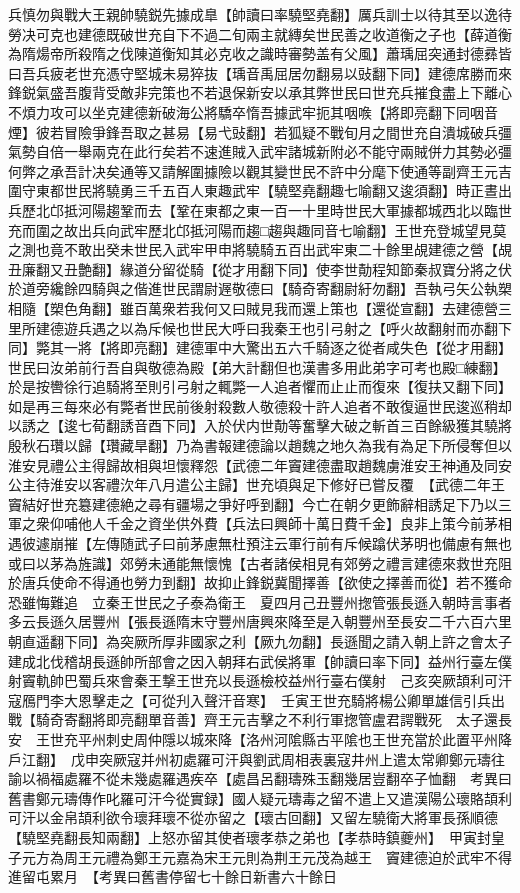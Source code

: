兵慎勿與戰大王親帥驍鋭先據成臯【帥讀曰率驍堅堯翻】厲兵訓士以待其至以逸待勞决可克也建德既破世充自下不過二旬兩主就縳矣世民善之收道衡之子也【薛道衡為隋煬帝所殺隋之伐陳道衡知其必克收之識時審勢盖有父風】蕭瑀屈突通封德彞皆曰吾兵疲老世充憑守堅城未易猝抜【瑀音禹屈居勿翻易以䜴翻下同】建德席勝而來鋒鋭氣盛吾腹背受敵非完策也不若退保新安以承其弊世民曰世充兵摧食盡上下離心不煩力攻可以坐克建德新破海公將驕卒惰吾據武牢扼其咽㗋【將即亮翻下同咽音煙】彼若冒險爭鋒吾取之甚易【易弋䜴翻】若狐疑不戰旬月之間世充自潰城破兵彊氣勢自倍一舉兩克在此行矣若不速進賊入武牢諸城新附必不能守兩賊併力其勢必彊何弊之承吾計决矣通等又請解圍據險以觀其變世民不許中分麾下使通等副齊王元吉圍守東都世民將驍勇三千五百人東趣武牢【驍堅堯翻趣七喻翻又逡須翻】時正晝出兵歷北邙抵河陽趨鞏而去【鞏在東都之東一百一十里時世民大軍據都城西北以臨世充而圍之故出兵向武牢歷北邙抵河陽而趨□趨與趣同音七喻翻】王世充登城望見莫之測也竟不敢出癸未世民入武牢甲申將驍騎五百出武牢東二十餘里覘建德之營【覘丑廉翻又丑艶翻】緣道分留從騎【從才用翻下同】使李世勣程知節秦叔寶分將之伏於道旁纔餘四騎與之偕進世民謂尉遟敬德曰【騎奇寄翻尉紆勿翻】吾執弓矢公執槊相隨【槊色角翻】雖百萬衆若我何又曰賊見我而還上策也【還從宣翻】去建德營三里所建德遊兵遇之以為斥候也世民大呼曰我秦王也引弓射之【呼火故翻射而亦翻下同】斃其一將【將即亮翻】建德軍中大驚出五六千騎逐之從者咸失色【從才用翻】世民曰汝弟前行吾自與敬德為殿【弟大計翻但也漢書多用此弟字可考也殿□練翻】於是按轡徐行追騎將至則引弓射之輒斃一人追者懼而止止而復來【復扶又翻下同】如是再三每來必有斃者世民前後射殺數人敬德殺十許人追者不敢復逼世民逡巡稍却以誘之【逡七荀翻誘音酉下同】入於伏内世勣等奮擊大破之斬首三百餘級獲其驍將殷秋石瓚以歸【瓚藏旱翻】乃為書報建德論以趙魏之地久為我有為足下所侵奪但以淮安見禮公主得歸故相與坦懷釋怨【武德二年竇建德盡取趙魏虜淮安王神通及同安公主待淮安以客禮㳄年八月遣公主歸】世充頃與足下修好已嘗反覆　【武德二年王竇結好世充簒建德絶之尋有疆場之爭好呼到翻】今亡在朝夕更飾辭相誘足下乃以三軍之衆仰哺他人千金之資坐供外費【兵法曰興師十萬日費千金】良非上策今前茅相遇彼遽崩摧【左傳随武子曰前茅慮無杜預注云軍行前有斥候蹹伏茅明也備慮有無也或曰以茅為旌識】郊勞未通能無懷愧【古者諸侯相見有郊勞之禮言建德來救世充阻於唐兵使命不得通也勞力到翻】故抑止鋒鋭冀聞擇善【欲使之擇善而從】若不獲命恐雖悔難追　立秦王世民之子泰為衛王　夏四月己丑豐州揔管張長遜入朝時言事者多云長遜久居豐州【張長遜隋末守豐州唐興來降至是入朝豐州至長安二千六百六里朝直遥翻下同】為突厥所厚非國家之利【厥九勿翻】長遜聞之請入朝上許之會太子建成北伐稽胡長遜帥所部會之因入朝拜右武侯將軍【帥讀曰率下同】益州行臺左僕射竇軌帥巴蜀兵來會秦王撃王世充以長遜檢校益州行臺右僕射　己亥突厥頡利可汗寇鴈門李大恩擊走之【可從刋入聲汗音寒】　壬寅王世充騎將楊公卿單雄信引兵出戰【騎奇寄翻將即亮翻單音善】齊王元吉擊之不利行軍揔管盧君諤戰死　太子還長安　王世充平州刺史周仲隱以城來降【洛州河隂縣古平隂也王世充當於此置平州降戶江翻】　戊申突厥寇并州初處羅可汗與劉武周相表裏寇井州上遣太常卿鄭元璹往諭以禍福處羅不從未幾處羅遇疾卒【處昌呂翻璹殊玉翻幾居豈翻卒子恤翻　考異曰舊書鄭元璹傳作叱羅可汗今從實録】國人疑元璹毒之留不遣上又遣漢陽公瓌賂頡利可汗以金帛頡利欲令瓌拜瓌不從亦留之【瓌古回翻】又留左驍衛大將軍長孫順德【驍堅堯翻長知兩翻】上怒亦留其使者瓌孝恭之弟也【孝恭時鎮夔州】　甲寅封皇子元方為周王元禮為鄭王元嘉為宋王元則為荆王元茂為越王　竇建德迫於武牢不得進留屯累月　【考異曰舊書停留七十餘日新書六十餘日